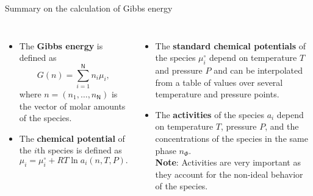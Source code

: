 \begin{frame}{Summary on the calculation of Gibbs energy}
	\begin{columns}[t]
		
		\begin{itemize}[<+->]
			\item The \alert{\bf Gibbs energy} is defined as
			\[
			G(n)=\sum_{i=1}^{\mathsf{N}}n_{i}\mu_{i},
			\]
			where $n=(n_{1},\ldots,n_{\mathsf{N}})$ is the vector of molar amounts
			of the species. 
			\item The \alert{\bf chemical potential} of the $i$th species is defined as
			\[
			\mu_{i}=\mu_{i}^{\circ}+RT\ln a_{i}(n, T, P).
			\]
		\end{itemize}
		
		\begin{itemize}[<+->]
			\item The \alert{\bf standard chemical potentials} of the species $\mu_{i}^{\circ}$
			depend on temperature $T$ and pressure $P$ and can be interpolated
			from a table of values over several temperature and pressure points.
			\item The \alert{\bf activities} of the species $a_{i}$ depend on temperature
			$T$, pressure $P$, and the concentrations of the species in the
			same phase $n_{\Phi}$. \\
			{\bf Note}: Activities are very important as they account for the non-ideal behavior of the species. 
		\end{itemize}
	\end{columns}
	
\end{frame}
%
